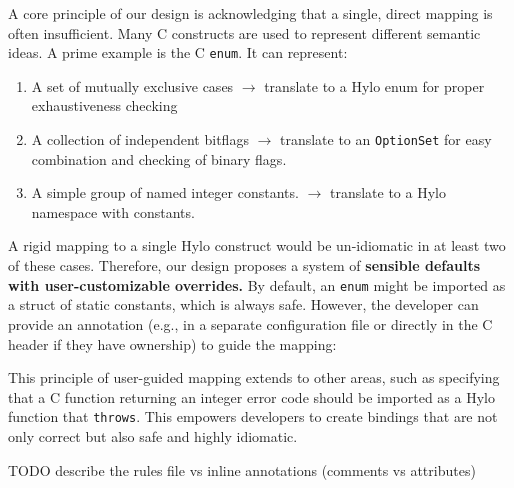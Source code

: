 A core principle of our design is acknowledging that a single, direct mapping is often insufficient. Many C constructs are used to represent different semantic ideas. A prime example is the C \texttt{enum}. It can represent:
\begin{enumerate}
    \item A set of mutually exclusive cases \(\rightarrow\) translate to a Hylo enum for proper exhaustiveness checking
    \item A collection of independent bitflags \(\rightarrow\) translate to an \texttt{OptionSet} \cite{OptionSet} for easy combination and checking of binary flags.
    \item A simple group of named integer constants. \(\rightarrow\) translate to a Hylo namespace with constants.
\end{enumerate}
A rigid mapping to a single Hylo construct would be un-idiomatic in at least two of these cases. Therefore, our design proposes a system of \textbf{sensible defaults with user-customizable overrides.} By default, an \texttt{enum} might be imported as a struct of static constants, which is always safe. However, the developer can provide an annotation (e.g., in a separate configuration file or directly in the C header if they have ownership) to guide the mapping:

This principle of user-guided mapping extends to other areas, such as specifying that a C function returning an integer error code should be imported as a Hylo function that \texttt{throws}. This empowers developers to create bindings that are not only correct but also safe and highly idiomatic.

TODO describe the rules file vs inline annotations (comments vs attributes)